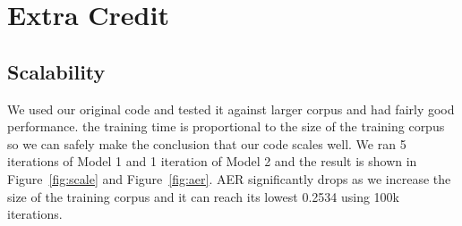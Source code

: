 \documentclass{article}
\begin{document}
\section{Extra Credit}

\subsection{Scalability}

We used our original code and tested it against larger corpus and had fairly good performance. the training time is proportional to the size of the training corpus so we can safely make the conclusion that our code scales well. We ran 5 iterations of Model 1 and 1 iteration of Model 2 and the result is shown in Figure~\ref{fig:scale} and Figure~\ref{fig:aer}. AER significantly drops as we increase the size of the training corpus and it can reach its lowest 0.2534 using 100k iterations.
\end{document}

